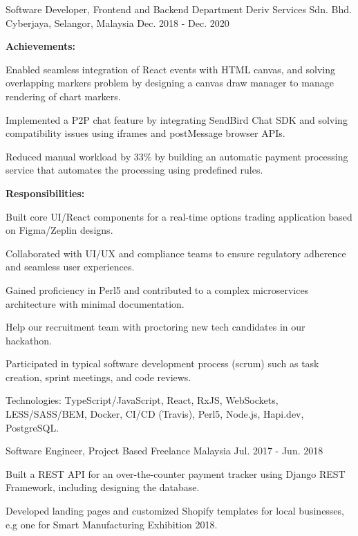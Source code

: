 \begin{cventries}
  \cventry
    {Software Developer, Frontend and Backend Department} %
    {Deriv Services Sdn. Bhd.} %
    {Cyberjaya, Selangor, Malaysia} %
    {Dec. 2018 - Dec. 2020} %
    {
      \textbf{Achievements:}
      \vspace{1.5em}
      \begin{cvitems} %
        \item {Enabled seamless integration of React events with HTML canvas, and solving overlapping markers problem by designing a canvas draw manager to manage rendering of chart markers.}
        \item {Implemented a P2P chat feature by integrating SendBird Chat SDK and solving compatibility issues using iframes and postMessage browser APIs.}
        \item {Reduced manual workload by 33\% by building an automatic payment processing service that automates the processing using predefined rules.}
      \end{cvitems}
      \vspace{1.5em}
      \textbf{Responsibilities:}
      \vspace{1.5em}
      \begin{cvitems} %
        \item {Built core UI/React components for a real-time options trading application based on Figma/Zeplin designs.}
        \item {Collaborated with UI/UX and compliance teams to ensure regulatory adherence and seamless user experiences.}
        \item {Gained proficiency in Perl5 and contributed to a complex microservices architecture with minimal documentation.}
        \item {Help our recruitment team with proctoring new tech candidates in our hackathon.}
        \item {Participated in typical software development process (scrum) such as task creation, sprint meetings, and code reviews.}
        \item {Technologies: TypeScript/JavaScript, React, RxJS, WebSockets, LESS/SASS/BEM, Docker, CI/CD (Travis), Perl5, Node.js, Hapi.dev, PostgreSQL.}
      \end{cvitems}
    }

  \cventry
    {Software Engineer, Project Based} %
    {Freelance} %
    {Malaysia} %
    {Jul. 2017 - Jun. 2018} %
    {
      \begin{cvitems} %
        \item {Built a REST API for an over-the-counter payment tracker using Django REST Framework, including designing the database.}
        \item {Developed landing pages and customized Shopify templates for local businesses, e.g one for Smart Manufacturing Exhibition 2018.}
      \end{cvitems}
    }

\end{cventries}

\pagebreak
